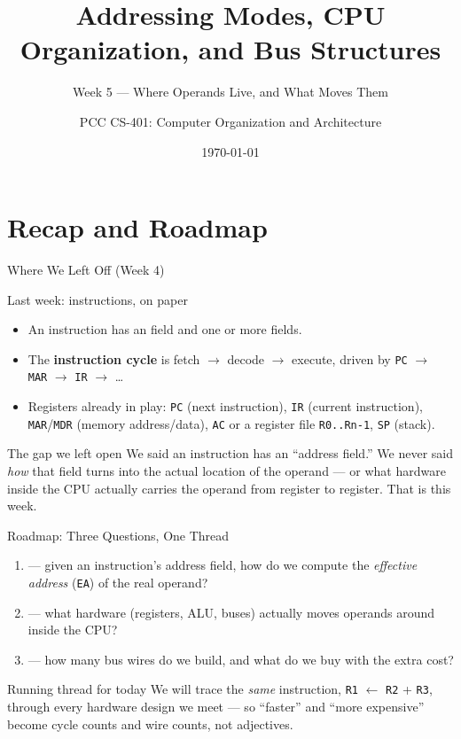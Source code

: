 \documentclass[aspectratio=169]{beamer}
\title{Addressing Modes, CPU Organization, and Bus Structures}
\subtitle{Week 5 --- Where Operands Live, and What Moves Them}
\author{PCC CS-401: Computer Organization and Architecture}
\date{\today}
\begin{document}
\frame{\titlepage}

\section{Recap and Roadmap}

\begin{frame}{Where We Left Off (Week 4)}
  \begin{block}{Last week: instructions, on paper}
    \begin{itemize}
      \item An instruction has an  field and one or more  fields.
      \item The \textbf{instruction cycle} is fetch $\to$ decode $\to$ execute, driven by
        \texttt{PC} $\to$ \texttt{MAR} $\to$ \texttt{IR} $\to$ \dots
      \item Registers already in play: \texttt{PC} (next instruction), \texttt{IR}
        (current instruction), \texttt{MAR}/\texttt{MDR} (memory address/data),
        \texttt{AC} or a register file \texttt{R0..Rn-1}, \texttt{SP} (stack).
    \end{itemize}
  \end{block}
  \vspace{0.3cm}
  \begin{exampleblock}{The gap we left open}
    We said an instruction has an ``address field.'' We never said \emph{how} that
    field turns into the actual location of the operand --- or what hardware inside
    the CPU actually carries the operand from register to register. That is this week.
  \end{exampleblock}
\end{frame}

\begin{frame}{Roadmap: Three Questions, One Thread}
  \begin{enumerate}
    \item {} --- given an instruction's address field, how do we
      compute the \emph{effective address} (\texttt{EA}) of the real operand?
    \item {} --- what hardware (registers, ALU, buses) actually
      moves operands around inside the CPU?
    \item {} --- how many bus wires do we build,
      and what do we buy with the extra cost?
    \end{enumerate}
  \vspace{0.4cm}
  \begin{alertblock}{Running thread for today}
    We will trace the \emph{same} instruction, \texttt{R1} $\gets$ \texttt{R2} + \texttt{R3},
    through every hardware design we meet --- so ``faster'' and ``more expensive''
    become cycle counts and wire counts, not adjectives.
  \end{alertblock}
\end{frame}
\end{document}
